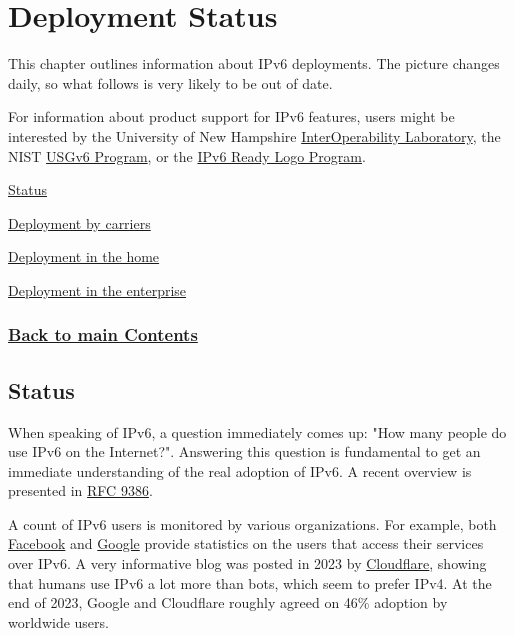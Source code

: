 \documentclass[
]{article}
\begin{document}
\section{Deployment Status}\label{deployment-status}

This chapter outlines information about IPv6 deployments. The picture
changes daily, so what follows is very likely to be out of date.

For information about product support for IPv6 features, users might be
interested by the University of New Hampshire
\href{https://www.iol.unh.edu/testing/ipv6}{InterOperability
Laboratory}, the NIST
\href{https://www.nist.gov/programs-projects/usgv6-program}{USGv6
Program}, or the \href{https://www.ipv6ready.org/}{IPv6 Ready Logo
Program}.

\hyperref[status]{Status}

\hyperref[deployment-by-carriers]{Deployment by carriers}

\hyperref[deployment-in-the-home]{Deployment in the home}

\hyperref[deployment-in-the-enterprise]{Deployment in the enterprise}

\subsubsection{\texorpdfstring{\hyperref[list-of-contents]{Back to main
Contents}}{Back to main Contents}}\label{back-to-main-contents-7}

\pagebreak

\subsection{Status}\label{status}

When speaking of IPv6, a question immediately comes up: "How many people
do use IPv6 on the Internet?". Answering this question is fundamental to
get an immediate understanding of the real adoption of IPv6. A recent
overview is presented in
\href{https://www.rfc-editor.org/info/rfc9386}{RFC 9386}.

A count of IPv6 users is monitored by various organizations. For
example, both
\href{https://www.facebook.com/ipv6/?tab=ipv6_total_adoption}{Facebook}
and \href{https://www.google.com/intl/en/ipv6/statistics.html}{Google}
provide statistics on the users that access their services over IPv6. A
very informative blog was posted in 2023 by
\href{https://blog.cloudflare.com/ipv6-from-dns-pov}{Cloudflare},
showing that humans use IPv6 a lot more than bots, which seem to prefer
IPv4. At the end of 2023, Google and Cloudflare roughly agreed on 46\%
adoption by worldwide users.
\end{document}
